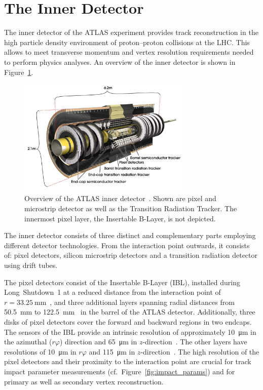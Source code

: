 \section{The Inner Detector}
\label{sec:atlas_tracking}

The inner detector of the ATLAS experiment provides track reconstruction in the
high particle density environment of proton--proton collisions at the LHC. This
allows to meet transverse momentum and vertex resolution requirements needed to
perform physics analyses. An overview of the inner detector is shown in
Figure~\ref{fig:atlas_indet}.

\begin{figure}[htb]
  \centering
  \includegraphics[width=0.75\textwidth]{./figures/atlas/inner_detector.jpg}
  \caption[Overview of the ATLAS inner detector]{Overview of the ATLAS inner
    detector~\cite{indet_fig}. Shown are pixel and microstrip detector as well
    as the Transition Radiation Tracker. The innermost pixel layer, the
    Insertable B-Layer, is not depicted.}
  \label{fig:atlas_indet}
\end{figure}

The inner detector consists of three distinct and complementary parts employing
different detector technologies. From the interaction point outwards, it
consists of: pixel detectors, silicon microstrip detectors and a transition
radiation detector using drift tubes.

The pixel detectors consist of the Insertable B-Layer (IBL), installed during
Long~Shutdown~1 at a reduced distance from the interaction point
of~$r = \SI{33.25}{\milli\metre}$~\cite{ibl_tdr}, and three additional layers
spanning radial distances from \SI{50.5}{\milli\metre} to
\SI{122.5}{\milli\metre}~\cite{atlas_detector} in the barrel of the ATLAS
detector. Additionally, three disks of pixel detectors cover the forward and
backward regions in two endcaps. The sensors of the IBL provide an intrinsic
resolution of approximately \SI{10}{\micro\metre} in the azimuthal ($r\varphi$)
direction and \SI{65}{\micro\metre} in $z$-direction~\cite{ibl_measurement}. The
other layers have resolutions of \SI{10}{\micro\metre} in $r\varphi$ and
\SI{115}{\micro\metre} in $z$-direction~\cite{atlas_detector}. The high
resolution of the pixel detectors and their proximity to the interaction point
are crucial for track impact parameter measurements (cf.\
Figure~\ref{fig:impact_params}) and for primary as well as secondary vertex
reconstruction.

